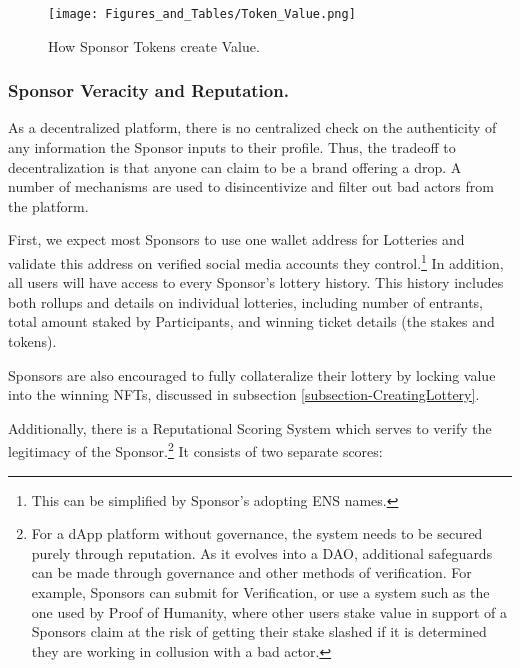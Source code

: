 \documentclass[runningheads]{llncs}
\begin{document}
\begin{figure}[H]
\centering
\texttt{[image: Figures\_and\_Tables/Token\_Value.png]}
\caption{How Sponsor Tokens create Value.}
\end{figure}

\subsubsection{Sponsor Veracity and Reputation.}  As a decentralized platform, there is no centralized check on the authenticity of any information the Sponsor inputs to their profile.  Thus, the tradeoff to decentralization is that anyone can claim to be a brand offering a drop.  A number of mechanisms are used to disincentivize and filter out bad actors from the platform.

First, we expect most Sponsors to use one wallet address for Lotteries and validate this address on verified social media accounts they control.\footnote{This can be simplified by Sponsor’s adopting ENS names.}   In addition, all users will have access to every Sponsor’s lottery history.  This history includes both rollups and details on individual lotteries, including number of entrants, total amount staked by Participants, and winning ticket details (the stakes and tokens). 

Sponsors are also encouraged to fully collateralize their lottery by locking value into the winning NFTs, discussed in subsection \ref{subsection-CreatingLottery}.

Additionally, there is a Reputational Scoring System which serves to verify the legitimacy of the Sponsor.\footnote{For a dApp platform without governance, the system needs to be secured purely through reputation.  As it evolves into a DAO, additional safeguards can be made through governance and other methods of verification.  For example, Sponsors can submit for Verification, or use a system such as the one used by Proof of Humanity, where other users stake value in support of a Sponsors claim at the risk of getting their stake slashed if it is determined they are working in collusion with a bad actor.}   It consists of two separate scores:
\end{document}
